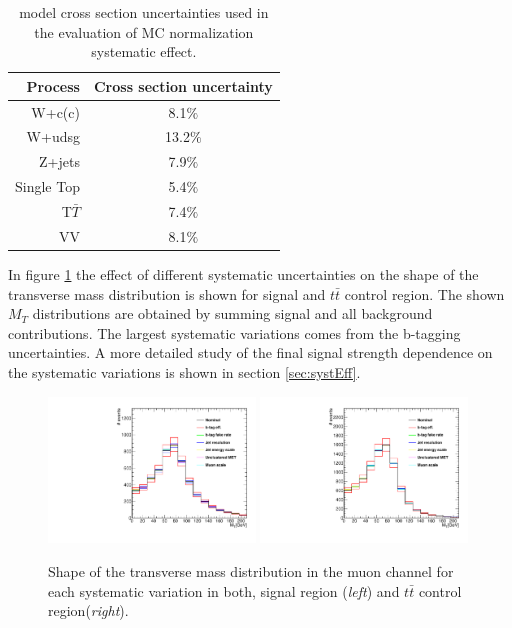 \begin{table}[!htb]
\begin{center}
   \begin{tabular} {r c} \hline \hline
        Process         & Cross section uncertainty \\
        \hline
        W+c(c)          & 8.1$\%$ \\
        W+udsg          & 13.2$\%$ \\
        Z+jets          & 7.9$\%$ \\
        Single Top      & 5.4$\%$ \\
        T$\bar{T}$      & 7.4$\%$ \\
        VV              & 8.1$\%$ \\
        \hline\hline
   \end{tabular}
\caption{
 model cross section uncertainties used in the evaluation of MC normalization systematic effect.}
\label{tab:SMunc}
\end{center}
\end{table}

In figure \ref{fig:shapeVar} the effect of different systematic uncertainties on the shape of the transverse mass distribution is shown for signal and $t\bar{t}$ control region. The shown $M_T$ distributions are obtained by summing signal and all background contributions. The largest systematic variations comes from the b-tagging uncertainties. A more detailed study of the final signal strength dependence on the systematic variations is shown in section \ref{sec:systEff}.

\begin{figure}[htbp]
	\centering
		\includegraphics[width=0.49\textwidth]{Figures/syst_Wbb_var.pdf}
		\includegraphics[width=0.49\textwidth]{Figures/syst_TT_var.pdf}
	\caption[Shape of the transverse mass distribution for each systematic variation in both, signal region and $t\bar{t}$ control region.]{Shape of the transverse mass distribution in the muon channel for each systematic variation in both, signal region (\textit{left}) and $t\bar{t}$ control region(\textit{right}).}
	\label{fig:shapeVar}
\end{figure}

